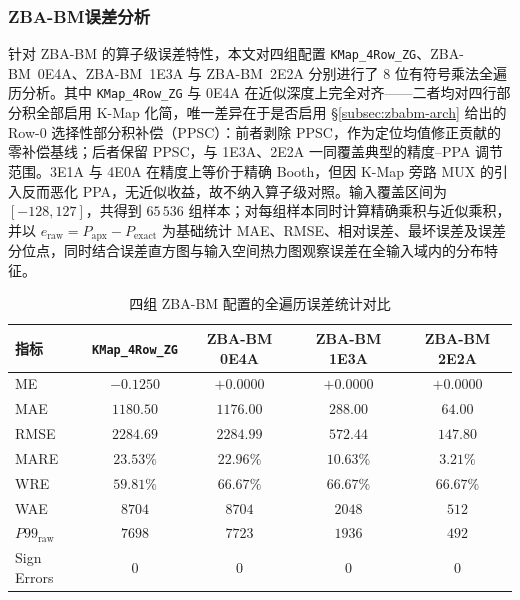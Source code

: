 \documentclass[12pt,a4paper,UTF8]{article}
\begin{document}
\clearpage
\subsubsection{ZBA-BM误差分析}
\label{subsec:zbabm-err}

针对 ZBA-BM 的算子级误差特性，本文对四组配置 \texttt{KMap\_4Row\_ZG}、ZBA-BM~0E4A、ZBA-BM~1E3A 与 ZBA-BM~2E2A 分别进行了 8 位有符号乘法全遍历分析。其中 \texttt{KMap\_4Row\_ZG} 与 0E4A 在近似深度上完全对齐——二者均对四行部分积全部启用 K-Map 化简，唯一差异在于是否启用 §\ref{subsec:zbabm-arch} 给出的 Row-0 选择性部分积补偿（PPSC）：前者剥除 PPSC，作为定位均值修正贡献的零补偿基线；后者保留 PPSC，与 1E3A、2E2A 一同覆盖典型的精度--PPA 调节范围。3E1A 与 4E0A 在精度上等价于精确 Booth，但因 K-Map 旁路 MUX 的引入反而恶化 PPA，无近似收益，故不纳入算子级对照。输入覆盖区间为 $[-128,127]$，共得到 $65\,536$ 组样本；对每组样本同时计算精确乘积与近似乘积，并以
\(
e_{\mathrm{raw}}=P_{\mathrm{apx}}-P_{\mathrm{exact}}
\)
为基础统计 MAE、RMSE、相对误差、最坏误差及误差分位点，同时结合误差直方图与输入空间热力图观察误差在全输入域内的分布特征。

\begin{table}[htbp]
    \centering
    \caption{四组 ZBA-BM 配置的全遍历误差统计对比}
    \label{tab:zbabm-variants-err}
    \small
    \setlength{\tabcolsep}{5pt}
    \begin{tabular}{lcccc}
        \toprule
        指标 & \texttt{KMap\_4Row\_ZG} & ZBA-BM 0E4A & ZBA-BM 1E3A & ZBA-BM 2E2A \\
        \midrule
        ME      & $-0.1250$ & $+0.0000$ & $+0.0000$ & $+0.0000$ \\
        MAE     & $1180.50$ & $1176.00$ & $288.00$  & $64.00$ \\
        RMSE    & $2284.69$ & $2284.99$ & $572.44$  & $147.80$ \\
        MARE    & $23.53\%$ & $22.96\%$ & $10.63\%$ & $3.21\%$ \\
        WRE     & $59.81\%$ & $66.67\%$ & $66.67\%$ & $66.67\%$ \\
        WAE     & $8704$    & $8704$    & $2048$    & $512$ \\
        $P99_{\mathrm{raw}}$ & $7698$ & $7723$ & $1936$ & $492$ \\
        Sign Errors & $0$ & $0$ & $0$ & $0$ \\
        \bottomrule
    \end{tabular}
\end{table}
\end{document}
